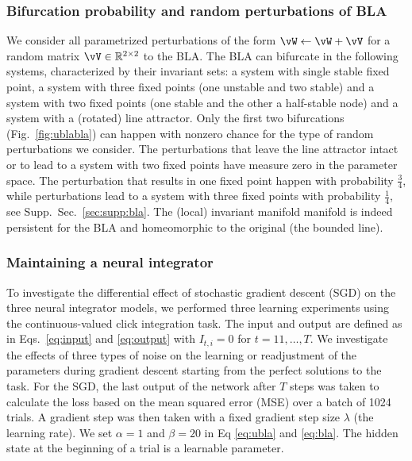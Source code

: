 \documentclass{article} %
\newcounter{ct}
\theoremstyle{definition}
\theoremstyle{remark}
\begin{document}
\subsubsection{Bifurcation probability and random perturbations of BLA}
We consider all parametrized perturbations of the form $ \vW \leftarrow \vW + \vV$ for a random matrix $\vV\in \mathbb{R}^{2\times 2}$ to the BLA.
The BLA can bifurcate in the following systems, characterized by their invariant sets: a system with single stable fixed point, a system with three fixed points (one unstable and two stable) and  a system with two fixed points (one stable and the other a half-stable node) and a system with a (rotated) line attractor. 
Only the first two bifurcations (Fig.~\ref{fig:ublabla}) can happen with nonzero chance for the type of random perturbations we consider.
The perturbations that leave the line attractor intact or to lead to a system with two fixed points have measure zero in the parameter space.
The perturbation that results in one fixed point happen with probability $\frac{3}{4}$, while perturbations lead to a system with three fixed points with probability $\frac{1}{4}$, see Supp.~Sec.~\ref{sec:supp:bla}.
The (local) %
 invariant manifold manifold is indeed persistent for the BLA and homeomorphic to the original (the bounded line).



\subsubsection{Maintaining a neural integrator}\label{sec:exp:maintaining}
To investigate the differential effect of stochastic gradient descent (SGD) on the three neural integrator models, we performed three learning experiments using the continuous-valued click integration task.
The input and output are defined as in Eqs.~\ref{eq:input} and \ref{eq:output} with $I_{t,i}=0$ for $t=11,\dots,T$.
We investigate the effects of three types of noise on the learning or readjustment of the parameters during gradient descent starting from the perfect solutions to the task.
For the SGD, the last output of the network after $T$ steps was taken to calculate the loss based on the mean squared error (MSE) over a batch of 1024 trials. A gradient step was then taken with a fixed gradient step size $\lambda$ (the learning rate). We set $\alpha=1$ and $\beta=20$ in Eq \ref{eq:ubla} and \ref{eq:bla}. The hidden state at the beginning of a trial is a learnable parameter. 
\end{document}
